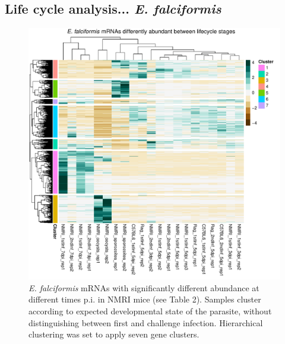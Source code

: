 \documentclass{bmcart}
\begin{document}
\subsection{Life cycle analysis... \textit{E. falciformis}}
\begin{figure}[h!]
	\includegraphics[width=\linewidth]{EfLifecycleHeatmap.pdf}  
	\caption{\textit{E. falciformis} mRNAs with significantly different abundance at different times p.i. in NMRI mice (see Table 2). Samples cluster according to expected developmental state of the parasite, without distinguishing between first and challenge infection. Hierarchical clustering was set to apply seven gene clusters.}
\end{figure}



\clearpage
\end{document}
